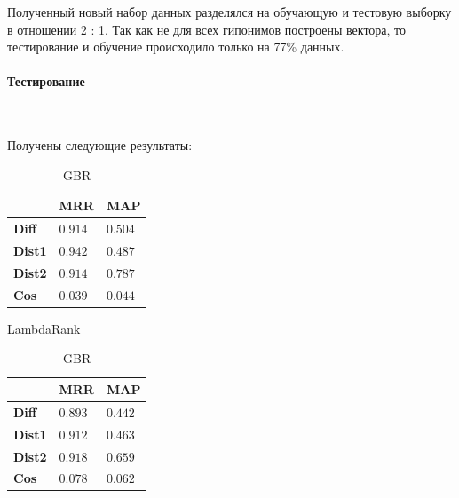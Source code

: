 Полученный новый набор данных разделялся на обучающую и тестовую выборку в
отношении 2 : 1. Так как не для всех гипонимов построены вектора, то тестирование и
обучение происходило только на 77\% данных.

\paragraph{Тестирование}
~\
~\

Получены следующие результаты:


\begin{table}[!htb]

\begin{minipage}{.5\textwidth}
\centering
\begin{tabular}{|l|l|l|}
\hline
 & \textbf{MRR} & \textbf{MAP} \\

\hline
\textbf{Diff} & $0.914$ & $0.504$\\

\hline
\textbf{Dist1} & $0.942$ & $0.487$\\

\hline
\textbf{Dist2} & $0.914$ & $0.787$\\

\hline
\textbf{Cos} & $0.039$ & $0.044$\\

\hline
\end{tabular}
\caption{LambdaRank}
\label{tabular:LambdaRank}
\end{minipage}%
\begin{minipage}{.5\textwidth}
\centering
\begin{tabular}{|l|l|l|}
\hline
 & \textbf{MRR} & \textbf{MAP} \\

\hline
\textbf{Diff} & $0.893$ & $0.442$\\

\hline
\textbf{Dist1} & $0.912$ & $0.463$\\

\hline
\textbf{Dist2} & $0.918$ & $0.659$\\

\hline
\textbf{Cos} & $0.078$ & $0.062$\\

\hline
\end{tabular}
\caption{GBR}
\label{tabular:GBR}
\end{minipage}

\end{table}


